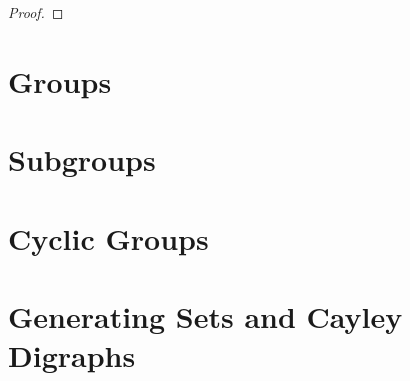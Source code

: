 \begin{proof}
\end{proof}

\section{Groups}
\setcounter{exercise}{0}

\section{Subgroups}
\setcounter{exercise}{0}

\section{Cyclic Groups}
\setcounter{exercise}{0}

\section{Generating Sets and Cayley Digraphs}
\setcounter{exercise}{0}
